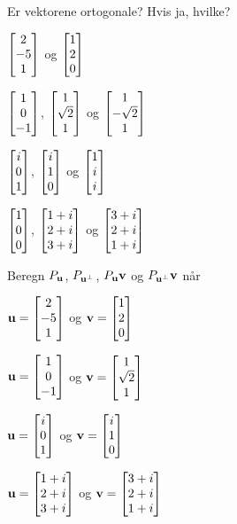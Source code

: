 
\begin{oppgave}
Er vektorene ortogonale? Hvis ja, hvilke?
\begin{punkt}
$\vvv{2}{-5}{1}$ og $\vvv{1}{2}{0}$ \\[4pt]
\end{punkt}

\begin{punkt}
$\vvv{1}{0}{-1}$, $\vvv{1}{\sqrt{2}}{1}$ og $\vvv{1}{-\sqrt{2}}{1}$ \\[4pt]
\end{punkt}

\begin{punkt}
$\vvv{i}{0}{1}$, $\vvv{i}{1}{0}$ og $\vvv{1}{i}{i}$ \\[4pt]
\end{punkt}

\begin{punkt}
$\vvv{1}{0}{0}$, $\vvv{1+i}{2+i}{3+i}$ og $\vvv{3+i}{2+i}{1+i}$ \\[4pt]
\end{punkt}
\end{oppgave}

\begin{oppgave}
Beregn $P_{\V u}$, $P_{\V u^{\perp}}$, $P_{\V u}\V v$ og $P_{\V u^{\perp}}\V v$ når \\[2pt]
\begin{punkt}
$\V{u}=\vvv{2}{-5}{1}$ og $\V{v}=\vvv{1}{2}{0}$\\[4pt]
\end{punkt}

\begin{punkt}
$\V{u}=\vvv{1}{0}{-1}$ og $\V{v}=\vvv{1}{\sqrt{2}}{1}$\\[4pt]
\end{punkt}

\begin{punkt}
$\V{u}=\vvv{i}{0}{1}$ og $\V{v}=\vvv{i}{1}{0}$\\[4pt]
\end{punkt}

\begin{punkt}
$\V{u}=\vvv{1+i}{2+i}{3+i}$ og $\V{v}=\vvv{3+i}{2+i}{1+i}$
\end{punkt}
\end{oppgave}




